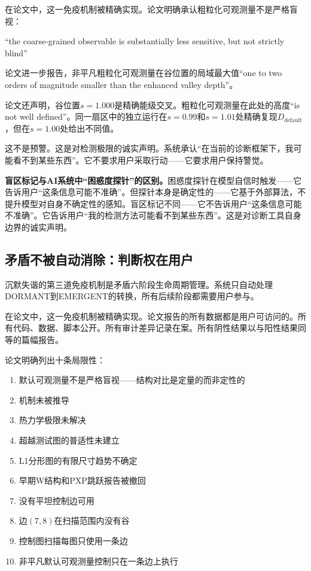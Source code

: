 \documentclass[11pt,a4paper]{book}
\theoremstyle{definition}
\begin{document}
在论文中，这一免疫机制被精确实现。论文明确承认粗粒化可观测量不是严格盲视：

“the coarse-grained observable is substantially less sensitive, but not strictly blind”

论文进一步报告，非平凡粗粒化可观测量在谷位置的局域最大值“one to two orders of magnitude smaller than the enhanced valley depth”。

论文还声明，谷位置$s=1.000$是精确能级交叉。粗粒化可观测量在此处的高度“is not well defined”。同一扇区中的独立运行在$s=0.99$和$s=1.01$处精确复现$D_{\text{default}}$，但在$s=1.00$处给出不同值。

这不是预警。这是对检测极限的诚实声明。系统承认“在当前的诊断框架下，我可能看不到某些东西”。它不要求用户采取行动——它要求用户保持警觉。

\textbf{盲区标记与AI系统中“困惑度探针”的区别。}困惑度探针在模型自信时触发——它告诉用户“这条信息可能不准确”。但探针本身是确定性的——它基于外部算法，不提升模型对自身不确定性的感知。盲区标记不同——它不告诉用户“这条信息可能不准确”。它告诉用户“我的检测方法可能看不到某些东西”。这是对诊断工具自身边界的诚实声明。

\subsection{矛盾不被自动消除：判断权在用户}

沉默失谐的第三道免疫机制是矛盾六阶段生命周期管理。系统只自动处理DORMANT到EMERGENT的转换，所有后续阶段都需要用户参与。

在论文中，这一免疫机制被精确实现。论文报告的所有数据都是用户可访问的。所有代码、数据、脚本公开。所有审计差异记录在案。所有阴性结果以与阳性结果同等的篇幅报告。

论文明确列出十条局限性：

\begin{enumerate}
\item 默认可观测量不是严格盲视——结构对比是定量的而非定性的
\item 机制未被推导
\item 热力学极限未解决
\item 超越测试图的普适性未建立
\item L1分形图的有限尺寸趋势不确定
\item 早期W结构和PXP跳跃报告被撤回
\item 没有平坦控制边可用
\item 边$(7,8)$在扫描范围内没有谷
\item 控制图扫描每图只使用一条边
\item 非平凡默认可观测量控制只在一条边上执行
\end{enumerate}
\end{document}

